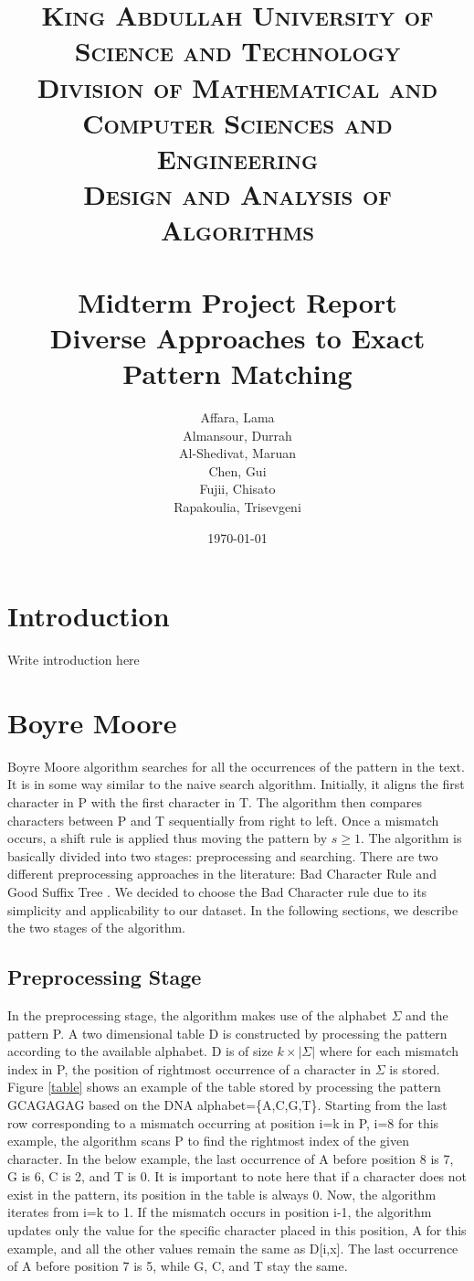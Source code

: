\documentclass[paper=a4, fontsize=11pt]{scrartcl} %
\title{
\normalfont \normalsize
\textsc{King Abdullah University of Science and Technology\\
        Division of Mathematical and Computer Sciences and Engineering\\
        Design and Analysis of Algorithms} \\ [25pt] %
\horrule{0.5pt} \\[0.4cm] %
\Large Midterm Project Report\\
\huge Diverse Approaches to Exact Pattern Matching
\horrule{2pt} \\[0.5cm] %
}
\author{Affara, Lama\\
        Almansour, Durrah\\
        Al-Shedivat, Maruan\\
        Chen, Gui\\
        Fujii, Chisato\\
        Rapakoulia, Trisevgeni}
\date{\normalsize\today} %
\numberwithin{equation}{section} %
\numberwithin{figure}{section} %
\numberwithin{table}{section} %
\begin{document}
\begin{titlepage}
\maketitle
\thispagestyle{empty}
\clearpage
\end{titlepage}


\section{Introduction}
Write introduction here

\section{Boyre Moore}
Boyre Moore algorithm \cite{bm_fast} searches for all the occurrences of the pattern in the text. It is in some way similar to the naive search algorithm. Initially, it aligns the first character in P with the first character in T. The algorithm then compares characters between P and T sequentially from right to left. Once a mismatch occurs, a shift rule is applied thus moving the pattern by $s\ge 1$. The algorithm is basically divided into two stages: preprocessing and searching. There are two different preprocessing approaches in the literature: Bad Character Rule and Good Suffix Tree \cite{bm_tbc}. We decided to choose the Bad Character rule due to its simplicity and applicability to our dataset. In the following sections, we describe the two stages of the algorithm.

\subsection{Preprocessing Stage}
In the preprocessing stage, the algorithm makes use of the alphabet $\Sigma$ and the pattern P. A two dimensional table D is constructed by processing the pattern according to the available alphabet. D is of size $k\times|\Sigma|$ where for each mismatch index in P, the position of rightmost occurrence of a character in $\Sigma$ is stored. Figure \ref{table} shows an example of the table stored by processing the pattern GCAGAGAG based on the DNA alphabet=\{A,C,G,T\}. Starting from the last row corresponding to a mismatch occurring at position i=k in P, i=8 for this example, the algorithm scans P to find the rightmost index of the given character. In the below example, the last occurrence of A before position 8 is 7, G is 6, C is 2, and T is 0. It is important to note here that if a character does not exist in the pattern, its position in the table is always 0. Now, the algorithm iterates from i=k to 1. If the mismatch occurs in position i-1, the algorithm updates only the value for the specific character placed in this position, A for this example, and all the other values remain the same as D[i,x]. The last occurrence of A before position 7 is 5, while G, C, and T stay the same.
\end{document}
